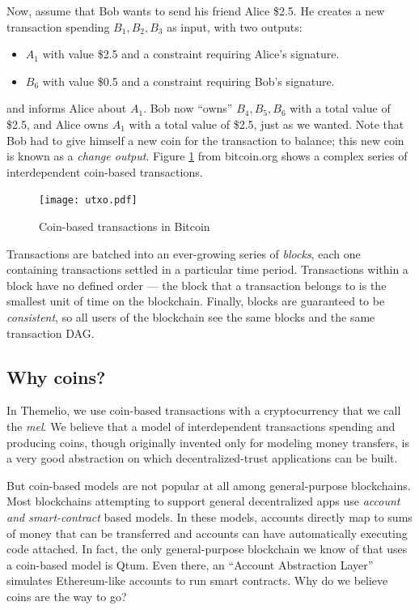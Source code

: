 \documentclass[headinclude]{scrbook}
\begin{document}
Now, assume that Bob wants to send his friend Alice \$2.5. He creates a new transaction spending $B_1,B_2,B_3$ as input, with two outputs:
\begin{itemize}
    \item $A_1$ with value \$2.5 and a constraint requiring Alice's signature.
    \item $B_6$ with value \$0.5 and a constraint requiring Bob's signature.
\end{itemize}
and informs Alice about $A_1$. Bob now ``owns'' $B_4,B_5,B_6$ with a total value of \$2.5, and Alice owns $A_1$ with a total value of \$2.5, just as we wanted. Note that Bob had to give himself a new coin for the transaction to balance; this new coin is known as a \emph{change output}. Figure \ref{fig:utxo} from bitcoin.org shows a complex series of interdependent coin-based transactions.

\begin{figure}
    \centering \texttt{[image: utxo.pdf]}
    \caption{Coin-based transactions in Bitcoin}
    \label{fig:utxo}
\end{figure}


Transactions are batched into an ever-growing series of \emph{blocks}, each one containing transactions settled in a particular time period. Transactions within a block have no defined order --- the block that a transaction belongs to is the smallest unit of time on the blockchain. Finally, blocks are guaranteed to be \emph{consistent}, so all users of the blockchain see the same blocks and the same transaction DAG.


\subsection{Why coins?}

In Themelio, we use coin-based transactions with a cryptocurrency that we call the \emph{mel}. We believe that a model of interdependent transactions spending and producing coins, though originally invented only for modeling money transfers, is a very good abstraction on which decentralized-trust applications can be built.

But coin-based models are not popular at all among general-purpose blockchains. Most blockchains attempting to support general decentralized apps use \emph{account and smart-contract} based models. In these models, accounts directly map to sums of money that can be transferred and accounts can have automatically executing code attached. In fact, the only general-purpose blockchain we know of that uses a coin-based model is Qtum. Even there, an ``Account Abstraction Layer'' simulates Ethereum-like accounts to run smart contracts. Why do we believe coins are the way to go?
\end{document}
